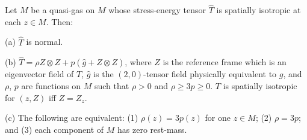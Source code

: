 Let $M$ be a quasi-gas on $M$ whose stress-energy tensor $\hat{T}$ is spatially isotropic at each $z \in M$. Then:

(a) $\hat{T}$ is normal.

(b) $\hat{T} = \rho Z \otimes Z + p(\hat{g} + Z \otimes Z)$, where $Z$ is the reference frame which is an eigenvector field of $T$, $\hat{g}$ is the $(2,0)$-tensor field physically equivalent to $g$, and $\rho$, $p$ are functions on $M$ such that $\rho > 0$ and $\rho \geq 3p \geq 0$. $T$ is spatially isotropic for $(z, Z)$ iff $Z = Z_z$.

(c) The following are equivalent: (1) $\rho(z) = 3p(z)$ for one $z \in M$; (2) $\rho = 3p$; and (3) each component of $M$ has zero rest-mass.
